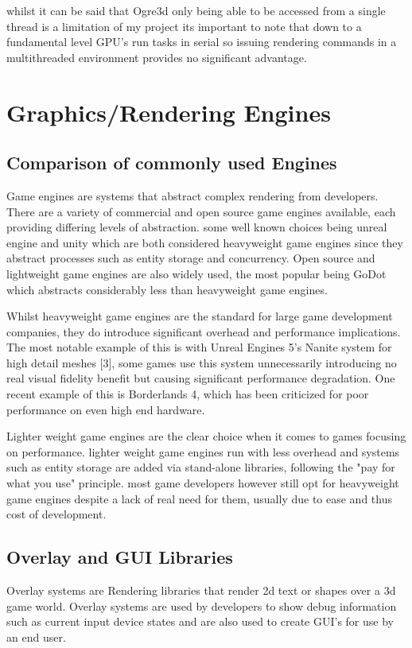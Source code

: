 \documentclass[]{final_report}
\begin{document}
whilst it can be said that Ogre3d only being able to be accessed from a single thread is a limitation of my project its important to note that down to a fundamental level GPU's run tasks in serial so issuing rendering commands in a multithreaded environment provides no significant advantage.
\section{Graphics/Rendering Engines}
\subsection{Comparison of commonly used Engines}
Game engines are systems that abstract complex rendering from developers. There are a variety of commercial and open source game engines available, each providing differing levels of abstraction. some well known choices being unreal engine and unity which are both considered heavyweight game engines since they abstract processes such as entity storage and concurrency. Open source and lightweight game engines are also widely used, the most popular being GoDot which abstracts considerably less than heavyweight game engines.

Whilst heavyweight game engines are the standard for large game development companies, they do introduce significant overhead and performance implications. The most notable example of this is with Unreal Engines 5's Nanite system for high detail meshes [3], some games use this system unnecessarily introducing no real visual fidelity benefit but causing significant performance degradation. One recent example of this is Borderlands 4, which has been criticized for poor performance on even high end hardware.

Lighter weight game engines are the clear choice when it comes to games focusing on performance. lighter weight game engines run with less overhead and systems such as entity storage are added via stand-alone libraries, following the "pay for what you use" principle. most game developers however still opt for heavyweight game engines despite a lack of real need for them, usually due to ease and thus cost of development. 

\subsection{Overlay and GUI Libraries}
Overlay systems are Rendering libraries that render 2d text or shapes over a 3d game world. Overlay systems are used by developers to show debug information such as current input device states and are also used to create GUI's for use by an end user. 
\end{document}
